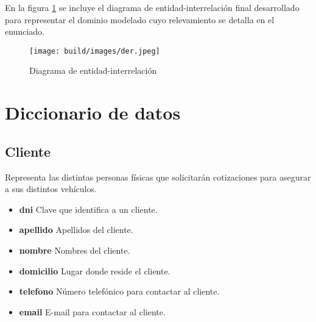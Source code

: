 \documentclass[a4paper,11pt]{article}
\begin{document}
 En la figura \ref{fig:der} se incluye el diagrama de entidad-interrelación
 final desarrollado para representar el dominio modelado cuyo relevamiento se
 detalla en el enunciado.

\begin{figure}[h!t]
  \centering
  \texttt{[image: build/images/der.jpeg]}
  \caption{Diagrama de entidad-interrelación} \label{fig:der}
\end{figure}

\FloatBarrier





  

\section{Diccionario de datos}

\subsection{Cliente}

Representa las distintas personas físicas que solicitarán cotizaciones para asegurar 
a sus distintos vehículos.

\begin{itemize}

  \item \textbf{dni} Clave que identifica a un cliente.
  
  \item \textbf{apellido} Apellidos del cliente.

  \item \textbf{nombre} Nombres del cliente.
  
  \item \textbf{domicilio} Lugar donde reside el cliente.
  
  \item \textbf{telefono} Número telefónico para contactar al cliente.
  
  \item \textbf{email} E-mail para contactar al cliente.
  
\end{itemize}
\end{document}
